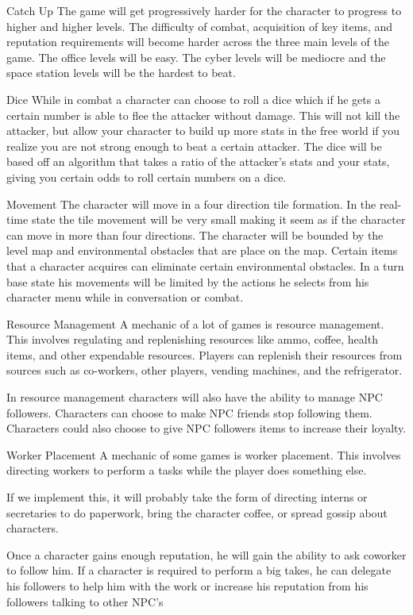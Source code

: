 \documentclass[12pt]{article}
\begin{document}
\begin{section}{Catch Up}
The game will get progressively harder for the character to progress to higher
and higher levels. The difficulty of combat, acquisition of key items, and
reputation requirements will become harder across the three main levels of the
game. The office levels will be easy. The cyber levels will be mediocre and the
space station levels will be the hardest to beat.
\end{section}

\begin{section}{Dice}
While in combat a character can choose to roll a dice which if he gets a certain
number is able to flee the attacker without damage. This will not kill the
attacker, but allow your character to build up more stats in the free world if
you realize you are not strong enough to beat a certain attacker. The dice will
be based off an algorithm that takes a ratio of the attacker’s stats and your
stats, giving you certain odds to roll certain numbers on a dice.
\end{section}

\begin{section}{Movement}
The character will move in a four direction tile formation. In the real-time
state the tile movement will be very small making it seem as if the character
can move in more than four directions. The character will be bounded by the
level map and environmental obstacles that are place on the map. Certain items
that a character acquires can eliminate certain environmental obstacles. In a
turn base state his movements will be limited by the actions he selects from his
character menu while in conversation or combat.
\end{section}

\begin{section}{Resource Management}
A mechanic of a lot of games is resource management.  This involves regulating
and replenishing resources like ammo, coffee, health items, and other expendable
resources.  Players can replenish their resources from sources such as
co-workers, other players, vending machines, and the refrigerator.

In resource management characters will also have the ability to manage NPC
followers. Characters can choose to make NPC friends stop following them.
Characters could also choose to give NPC followers items to increase their
loyalty.
\end{section}

\begin{section}{Worker Placement}
A mechanic of some games is worker placement. This involves
directing workers to perform a tasks while the player does something else.

If we implement this, it will probably take the form of directing interns or
secretaries to do paperwork, bring the character coffee, or spread gossip about
characters.

Once a character gains enough reputation, he will gain the ability to ask
coworker to follow him. If a character is required to perform a big takes, he
can delegate his followers to help him with the work or increase his reputation
from his followers talking to other NPC’s
\end{section}
\end{document}
